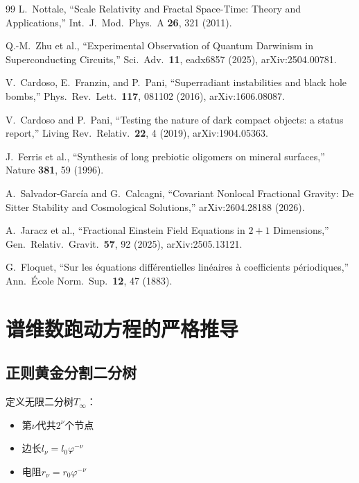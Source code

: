 \documentclass[12pt,a4paper,twocolumn]{article}
\renewcommand{\phi}{\varphi}
\begin{document}
\begin{thebibliography}{99}
L.~Nottale,
``Scale Relativity and Fractal Space-Time: Theory and Applications,''
Int.\ J.\ Mod.\ Phys.\ A \textbf{26}, 321 (2011).

Q.-M.~Zhu et al.,
``Experimental Observation of Quantum Darwinism in Superconducting Circuits,''
Sci.\ Adv.\ \textbf{11}, eadx6857 (2025), arXiv:2504.00781.

V.~Cardoso, E.~Franzin, and P.~Pani,
``Superradiant instabilities and black hole bombs,''
Phys.\ Rev.\ Lett.\ \textbf{117}, 081102 (2016), arXiv:1606.08087.

V.~Cardoso and P.~Pani,
``Testing the nature of dark compact objects: a status report,''
Living Rev.\ Relativ.\ \textbf{22}, 4 (2019), arXiv:1904.05363.

J.~Ferris et al.,
``Synthesis of long prebiotic oligomers on mineral surfaces,''
Nature \textbf{381}, 59 (1996).

A.~Salvador-Garc\'ia and G.~Calcagni,
``Covariant Nonlocal Fractional Gravity: De Sitter Stability and Cosmological Solutions,''
arXiv:2604.28188 (2026).

A.~Jaracz et al.,
``Fractional Einstein Field Equations in $2{+}1$ Dimensions,''
Gen.\ Relativ.\ Gravit.\ \textbf{57}, 92 (2025), arXiv:2505.13121.

G.~Floquet,
``Sur les \'equations diff\'erentielles lin\'eaires \`a coefficients p\'eriodiques,''
Ann.\ \'Ecole Norm.\ Sup.\ \textbf{12}, 47 (1883).

\end{thebibliography}

\appendix

\section{谱维数跑动方程的严格推导}
\label{app:spectral_dim}

\subsection{正则黄金分割二分树}
定义无限二分树$T_\infty$：
\begin{itemize}
\item 第$\nu$代共$2^\nu$个节点
\item 边长$l_\nu = l_0 \phi^{-\nu}$
\item 电阻$r_\nu = r_0 \phi^{-\nu}$
\end{itemize}
\end{document}
